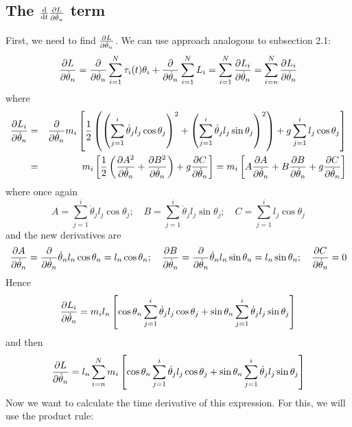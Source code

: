 \documentclass[12pt]{article}
\begin{document}
	\subsection{The $\dv{t}\pdv{L}{\dot{\theta}_n}$ term}
	
	First, we need to find $\pdv{L}{\dot{\theta}_n}$. We can use approach analogous to subsection 2.1:
	$$\pdv{L}{\dot{\theta}_n}=\pdv{}{\dot{\theta}_n}\sum_{i=1}^N\tau_i(t)\theta_i+\pdv{\dot{\theta}_n}\sum_{i=1}^N L_i=\sum_{i=1}^N \pdv{L_i}{\dot{\theta}_n}=\sum_{i=n}^N \pdv{L_i}{\dot{\theta}_n}$$
	where
	\begin{eqnarray*}
	\pdv{L_i}{\dot{\theta}_n}&=&\pdv{\dot{\theta}_n}m_i\left[\frac{1}{2}\left(\left(\sum_{j=1}^i \dot{\theta}_j l_j \cos{\theta_j}\right)^2+\left(\sum_{j=1}^i \dot{\theta}_j l_j \sin{\theta_j}\right)^2\right)+g\sum_{j=1}^i l_j \cos{\theta_j}\right]\\
	&=&m_i\left[\frac{1}{2}\left(\pdv{A^2}{\dot{\theta}_n}+\pdv{B^2}{\dot{\theta}_n}\right)+g\pdv{C}{\dot{\theta}_n}\right]=m_i\left[A\pdv{A}{\dot{\theta}_n}+B\pdv{B}{\dot{\theta}_n}+g\pdv{C}{\dot{\theta}_n}\right]
	\end{eqnarray*}
	where once again
	$$A=\sum_{j=1}^i \dot{\theta}_j l_j \cos{\theta_j};\quad B=\sum_{j=1}^i \dot{\theta}_j l_j \sin{\theta_j};\quad C=\sum_{j=1}^i l_j \cos{\theta_j}$$
	and the new derivatives are
	$$\pdv{A}{\dot{\theta}_n}=\pdv{\dot{\theta}_n}\dot{\theta}_n l_n \cos{\theta_n}=l_n \cos{\theta_n};\quad \pdv{B}{\dot{\theta}_n}=\pdv{\dot{\theta}_n} \dot{\theta}_n l_n \sin{\theta_n}=l_n \sin{\theta_n};\quad \pdv{C}{\dot{\theta}_n}=0$$
	Hence
	$$\pdv{L_i}{\dot{\theta}_n}=m_il_n\left[\cos{\theta_n}\sum_{j=1}^i \dot{\theta}_j l_j \cos{\theta_j}+ \sin{\theta_n}\sum_{j=1}^i \dot{\theta}_j l_j \sin{\theta_j}\right]$$
	and then
	$$\pdv{L}{\dot{\theta}_n}=l_n\sum_{i=n}^N m_i\left[\cos{\theta_n}\sum_{j=1}^i \dot{\theta}_j l_j \cos{\theta_j}+ \sin{\theta_n}\sum_{j=1}^i \dot{\theta}_j l_j \sin{\theta_j}\right]$$
	Now we want to calculate the time derivative of this expression. For this, we will use the product rule:
\end{document}
